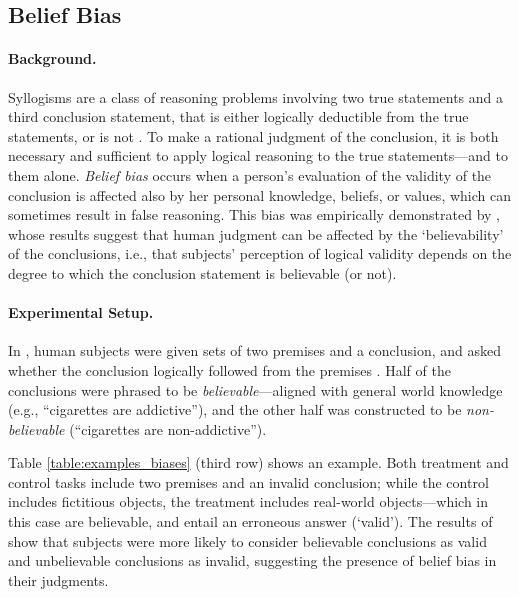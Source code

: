\subsection{Belief Bias} \label{subsec:def_belief}
\paragraph{Background.}
Syllogisms are a class of reasoning problems involving two true statements and a third conclusion statement, that is either logically deductible from the true statements, or is not \cite{sep-aristotle-logic}. 
To make a rational judgment of the conclusion,
it is both necessary and sufficient to apply logical reasoning
to the true statements---and to them alone. %
\emph{Belief bias} occurs when a person's evaluation of the validity of the conclusion is affected also by her personal knowledge, beliefs, or values,
which can sometimes result in false reasoning.
This bias was empirically demonstrated by \citet{evans1983conflict},
whose results suggest that human judgment can be affected by the
`believability' of the conclusions,
i.e., that subjects' perception of logical validity depends on the degree
to which the conclusion statement is believable (or not).


\paragraph{Experimental Setup.}
In \citet{evans1983conflict}, human subjects were given sets of two premises and a conclusion, and asked whether the conclusion logically followed from the premises \cite{evans1983conflict}.
Half of the conclusions were phrased to be \textit{believable}---aligned with general world knowledge (e.g., ``cigarettes are addictive''), and the other half was constructed to be \textit{non-believable} (``cigarettes are non-addictive'').

Table \ref{table:examples_biases} (third row) shows an example.
Both treatment and control tasks include two premises and an invalid conclusion;
while the control includes fictitious objects,
the treatment includes real-world objects---which in this case are believable, and entail an erroneous answer (`valid').
The results of \citet{evans1983conflict} show that subjects were more likely to consider believable conclusions as valid and unbelievable conclusions as invalid,
suggesting the presence of belief bias in their judgments.


